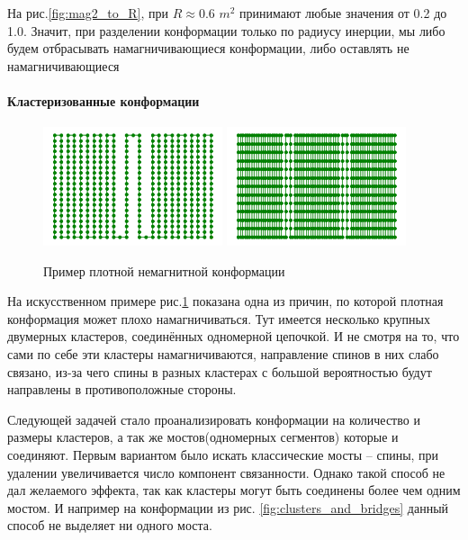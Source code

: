 На рис.\ref{fig:mag2_to_R}, при $R \approx 0.6$ $m^2$ принимают любые значения от 0.2 до 1.0. Значит, при разделении конформации только по радиусу инерции, мы либо будем отбрасывать намагничивающиеся конформации, либо оставлять не намагничивающиеся

\paragraph{Кластеризованные конформации}

\begin{figure}[h!]
	\centering
	\includegraphics[width=0.47\textwidth]{../images/2Cluster_conformation.png}
	\includegraphics[width=0.47\textwidth]{../images/3Cluster_conformation.png} 
	\caption{Пример плотной немагнитной конформации}
	\label{fig:synth_cluster_conf}
\end{figure}

На искусственном примере рис.\ref{fig:synth_cluster_conf} показана одна из причин, по которой плотная конформация может плохо намагничиваться. Тут имеется несколько крупных двумерных кластеров, соединённых одномерной цепочкой. И не смотря на то, что сами по себе эти кластеры намагничиваются, направление спинов в них слабо связано, из-за чего спины в разных кластерах с большой вероятностью будут направлены в противоположные стороны.


Следующей задачей стало проанализировать конформации на количество и размеры кластеров, а так же мостов(одномерных сегментов) которые и соединяют. Первым вариантом было искать классические мосты -- спины, при удалении увеличивается число компонент связанности. Однако такой способ не дал желаемого эффекта, так как кластеры могут быть соединены более чем одним мостом. И например на конформации из рис. \ref{fig:clusters_and_bridges} данный способ не выделяет ни одного моста. 



